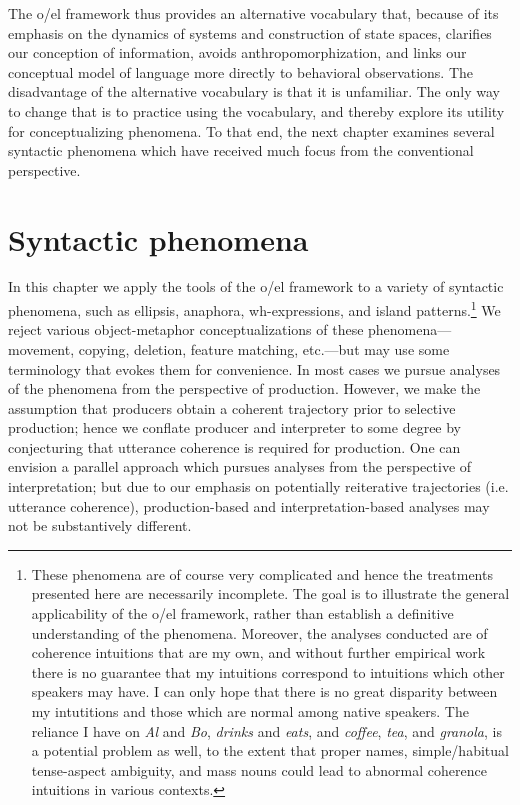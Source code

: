 The o/el framework thus provides an alternative vocabulary that, because of its emphasis on the dynamics of systems and construction of state spaces, clarifies our conception of information, avoids anthropomorphization, and links our conceptual model of language more directly to behavioral observations. The disadvantage of the alternative vocabulary is that it is unfamiliar. The only way to change that is to practice using the vocabulary, and thereby explore its utility for conceptualizing phenomena. To that end, the next chapter examines several syntactic phenomena which have received much focus from the conventional perspective.  

\chapter{Syntactic phenomena}

In this chapter we apply the tools of the o/el framework to a variety of syntactic phenomena, such as ellipsis, anaphora, wh-expressions, and island patterns.\footnote{These phenomena are of course very complicated and hence the treatments presented here are necessarily incomplete. The goal is to illustrate the general applicability of the o/el framework, rather than establish a definitive understanding of the phenomena. Moreover, the analyses conducted are of coherence intuitions that are my own, and without further empirical work there is no guarantee that my intuitions correspond to intuitions which other speakers may have. I can only hope that there is no great disparity between my intutitions and those which are normal among native speakers. The reliance I have on \textit{Al} and \textit{Bo}, \textit{drinks} and \textit{eats}, and \textit{coffee}, \textit{tea}, and \textit{granola}, is a potential problem as well, to the extent that proper names, simple/habitual tense-aspect ambiguity, and mass nouns could lead to abnormal coherence intuitions in various contexts.} We reject various object-metaphor conceptualizations of these phenomena—movement, copying, deletion, feature matching, etc.—but may use some terminology that evokes them for convenience. In most cases we pursue analyses of the phenomena from the perspective of production. However, we make the assumption that producers obtain a coherent trajectory prior to selective production; hence we conflate producer and interpreter to some degree by conjecturing that utterance coherence is required for production. One can envision a parallel approach which pursues analyses from the perspective of interpretation; but due to our emphasis on potentially reiterative trajectories (i.e. utterance coherence), production-based and interpretation-based analyses may not be substantively different. 

